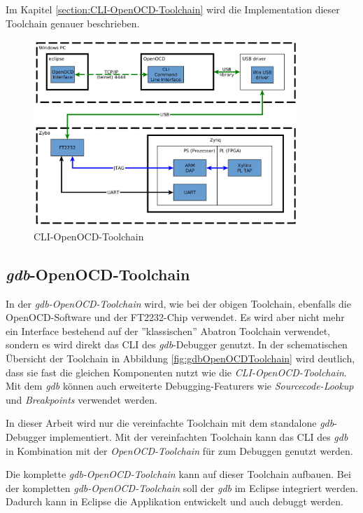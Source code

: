 Im Kapitel \ref{section:CLI-OpenOCD-Toolchain} wird die Implementation dieser Toolchain genauer beschrieben.


\begin{figure}[htbp]
	\centering
		\includegraphics[width=10cm,height=\textheight,keepaspectratio]{graphs/CLIOpenOCDToolchain.png}
	\caption{CLI-OpenOCD-Toolchain}
	\label{fig:CLIOpenOCDToolchain}
\end{figure}


\FloatBarrier
\subsection{\textit{gdb}-OpenOCD-Toolchain}
In der \textit{gdb-OpenOCD-Toolchain} wird, wie bei der obigen Toolchain, ebenfalls die OpenOCD-Software und der FT2232-Chip verwendet.
Es wird aber nicht mehr ein Interface bestehend auf der ''klassischen'' Abatron Toolchain verwendet, sondern es wird direkt das CLI des \textit{gdb}-Debugger genutzt.
In der schematischen Übersicht der Toolchain in Abbildung \ref{fig:gdbOpenOCDToolchain} wird deutlich, dass sie fast die gleichen Komponenten nutzt wie die \textit{CLI-OpenOCD-Toolchain}.
Mit dem \textit{gdb} können auch erweiterte Debugging-Featurers wie \textit{Sourcecode-Lookup} und \textit{Breakpoints} verwendet werden.

In dieser Arbeit wird nur die vereinfachte Toolchain mit dem standalone \textit{gdb}-Debugger implementiert.
Mit der vereinfachten Toolchain kann das CLI des \textit{gdb} in Kombination mit der \textit{OpenOCD-Toolchain} für zum Debuggen genutzt werden.

Die komplette \textit{gdb-OpenOCD-Toolchain} kann auf dieser Toolchain aufbauen.
Bei der kompletten \textit{gdb-OpenOCD-Toolchain} soll der \textit{gdb} im Eclipse integriert werden.
Dadurch kann in Eclipse die Applikation entwickelt und auch debuggt werden.


